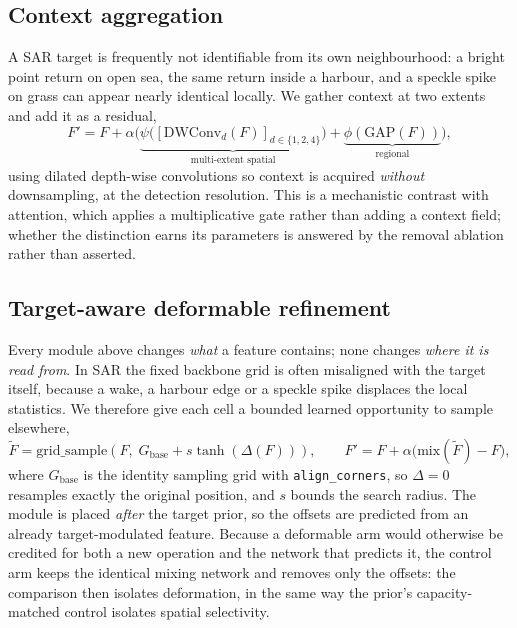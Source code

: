 \documentclass[10pt,twocolumn,letterpaper]{article}
\begin{document}
\subsection{Context aggregation}
\label{sec:cag}
A SAR target is frequently not identifiable from its own neighbourhood: a bright
point return on open sea, the same return inside a harbour, and a speckle spike
on grass can appear nearly identical locally. We gather context at two extents and
add it as a residual,
\begin{equation}
F' = F + \alpha\Big(\underbrace{\psi\big([\mathrm{DWConv}_d(F)]_{d \in \{1,2,4\}}\big)}_{\text{multi-extent spatial}}
+ \underbrace{\phi(\mathrm{GAP}(F))}_{\text{regional}}\Big),
\end{equation}
using dilated depth-wise convolutions so context is acquired \emph{without}
downsampling, at the detection resolution. This is a mechanistic contrast with
attention, which applies a multiplicative gate rather than adding a context field;
whether the distinction earns its parameters is answered by the removal ablation
rather than asserted.

\subsection{Target-aware deformable refinement}
\label{sec:tadr}
Every module above changes \emph{what} a feature contains; none changes \emph{where
it is read from}. In SAR the fixed backbone grid is often misaligned with the
target itself, because a wake, a harbour edge or a speckle spike displaces the
local statistics. We therefore give each cell a bounded learned opportunity to
sample elsewhere,
\begin{equation}
\tilde{F} = \mathrm{grid\_sample}\!\left(F,\; G_{\mathrm{base}}
+ s\tanh(\Delta(F))\right), \qquad
F' = F + \alpha\big(\mathrm{mix}(\tilde{F}) - F\big),
\end{equation}
where $G_{\mathrm{base}}$ is the identity sampling grid with
\texttt{align\_corners}, so $\Delta = 0$ resamples exactly the original position,
and $s$ bounds the search radius. The module is placed \emph{after} the target
prior, so the offsets are predicted from an already target-modulated feature.
Because a deformable arm would otherwise be credited for both a new operation and
the network that predicts it, the control arm keeps the identical mixing network
and removes only the offsets: the comparison then isolates deformation, in the
same way the prior's capacity-matched control isolates spatial selectivity.
\end{document}
